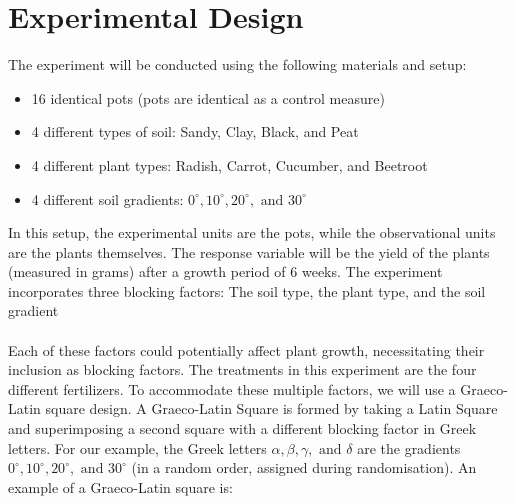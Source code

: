 \documentclass{article}
\begin{document}
\section{Experimental Design}
The experiment will be conducted using the following materials and setup:
\begin{itemize}
    \item 16 identical pots (pots are identical as a control measure)
    \item 4 different types of soil: Sandy, Clay, Black, and Peat
    \item 4 different plant types: Radish, Carrot, Cucumber, and Beetroot
    \item 4 different soil gradients: $0 ^{\circ}, 10^{\circ}, 20^{\circ}, \text{ and } 30^{\circ}$
\end{itemize}
In this setup, the experimental units are the pots, while the observational units are the plants themselves. The response variable will be the yield of the plants (measured in grams) after a growth period of 6 weeks.
The experiment incorporates three blocking factors: The soil type, the plant type, and the soil gradient \\ ~\\
Each of these factors could potentially affect plant growth, necessitating their inclusion as blocking factors. The treatments in this experiment are the four different fertilizers. To accommodate these multiple factors, we will use a Graeco-Latin square design. A Graeco-Latin Square is formed by taking a Latin Square and superimposing a second square with a different blocking factor in Greek letters. For our example, the Greek letters $\alpha, \beta, \gamma, \text{ and } \delta$ are the gradients $0^{\circ}, 10^{\circ}, 20^{\circ}, \text{ and } 30^{\circ}$ (in a random order, assigned during randomisation). An example of a Graeco-Latin square is:
\end{document}

